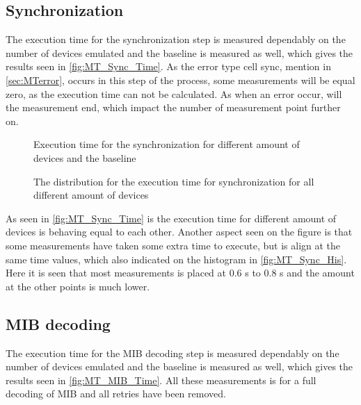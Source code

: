 \subsection{Synchronization}
The execution time for the synchronization step is measured dependably on the number of devices emulated and the baseline is measured as well, which gives the results seen in \autoref{fig:MT_Sync_Time}. As the error type cell sync, mention in \autoref{sec:MTerror}, occurs in this step of the process, some measurements will be equal zero, as the execution time can not be calculated. As when an error occur, will the measurement end, which impact the number of measurement point further on.

\captionsetup{belowskip=0em}
\begin{minipage}{0.48\textwidth}
\begin{figure}[H]
\centering
\resizebox{0.9\textwidth}{!}{
}
\caption{Execution time for the synchronization for different amount of devices and the baseline}
\label{fig:MT_Sync_Time}
\end{figure}
\end{minipage}%
\hfill
\begin{minipage}{0.48\textwidth}
\begin{figure}[H]
\centering
\resizebox{0.9\textwidth}{!}{
}
\caption{The distribution for the execution time for synchronization for all different amount of devices}
\label{fig:MT_Sync_His}
\end{figure}
\end{minipage}
\captionsetup{belowskip=-1.5em}

As seen in \autoref{fig:MT_Sync_Time} is the execution time for different amount of devices is behaving equal to each other. Another aspect seen on the figure is that some measurements have taken some extra time to execute, but is align at the same time values, which also indicated on the histogram in \autoref{fig:MT_Sync_His}. Here it is seen that most measurements is placed at 0.6 s to 0.8 s and the amount at the other points is much lower.



\subsection{MIB decoding}
The execution time for the MIB decoding step is measured dependably on the number of devices emulated and the baseline is measured as well, which gives the results seen in \autoref{fig:MT_MIB_Time}. All these measurements is for a full decoding of MIB and all retries have been removed.


